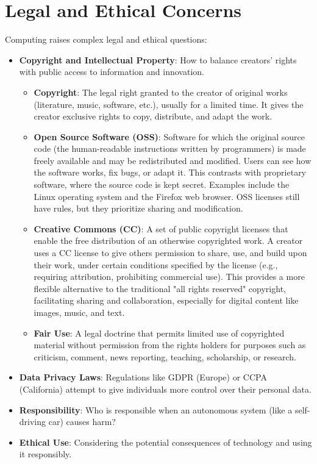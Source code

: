 \documentclass[11pt,oneside]{book}
\begin{document}
\section{Legal and Ethical Concerns}
\label{sec:legal_ethical}
Computing raises complex legal and ethical questions:
\begin{itemize}
    \item \textbf{Copyright and Intellectual Property}: How to balance creators' rights with public access to information and innovation. 
        \begin{itemize}
            \item \textbf{Copyright}: The legal right granted to the creator of original works (literature, music, software, etc.), usually for a limited time. It gives the creator exclusive rights to copy, distribute, and adapt the work. 
            \item \textbf{Open Source Software (OSS)}: Software for which the original source code (the human-readable instructions written by programmers) is made freely available and may be redistributed and modified. Users can see how the software works, fix bugs, or adapt it. This contrasts with proprietary software, where the source code is kept secret. Examples include the Linux operating system and the Firefox web browser. OSS licenses still have rules, but they prioritize sharing and modification.
            \item \textbf{Creative Commons (CC)}: A set of public copyright licenses that enable the free distribution of an otherwise copyrighted work. A creator uses a CC license to give others permission to share, use, and build upon their work, under certain conditions specified by the license (e.g., requiring attribution, prohibiting commercial use). This provides a more flexible alternative to the traditional "all rights reserved" copyright, facilitating sharing and collaboration, especially for digital content like images, music, and text.
            \item \textbf{Fair Use}: A legal doctrine that permits limited use of copyrighted material without permission from the rights holders for purposes such as criticism, comment, news reporting, teaching, scholarship, or research.
        \end{itemize}
    \item \textbf{Data Privacy Laws}: Regulations like GDPR (Europe) or CCPA (California) attempt to give individuals more control over their personal data.
    \item \textbf{Responsibility}: Who is responsible when an autonomous system (like a self-driving car) causes harm?
    \item \textbf{Ethical Use}: Considering the potential consequences of technology and using it responsibly.
\end{itemize}
\end{document}
